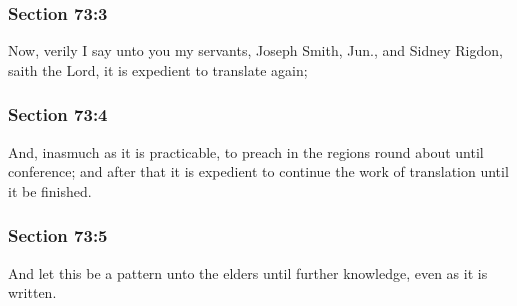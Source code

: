 	\subsubsection{Section 73:3} %
		\label{DC73-3}

		Now, verily I say unto you my servants, Joseph Smith, Jun., and Sidney Rigdon, saith the Lord, it is expedient to translate again;


	\subsubsection{Section 73:4} %
		\label{DC73-4}

		And, inasmuch as it is practicable, to preach in the regions round about until conference; and after that it is expedient to continue the work of translation until it be finished.


	\subsubsection{Section 73:5} %
		\label{DC73-5}

		And let this be a pattern unto the elders until further knowledge, even as it is written.



